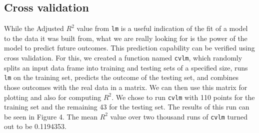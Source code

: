 \documentclass{article}
\begin{document}
\subsection{Cross validation}

While the Adjusted $R^2$ value from \verb=lm= is a useful indication of the fit
of a model to the data it was built from, what we are really looking for is the
power of the model to predict future outcomes. This prediction capability can
be verified using cross validation. For this, we created a function named
\verb=cvlm=, which randomly splits an input data frame into training and
testing sets of a specified size, runs \verb=lm= on the training set, predicts
the outcome of the testing set, and combines those outcomes with the real data
in a matrix. We can then use this matrix for plotting and also for computing
$R^2$. We chose to run \verb=cvlm= with 110 points for the training set and the
remaining 43 for the testing set. The results of this run can be seen in Figure
4. The mean $R^2$ value over two thousand runs of \verb=cvlm= turned out to be
0.1194353.
\end{document}
